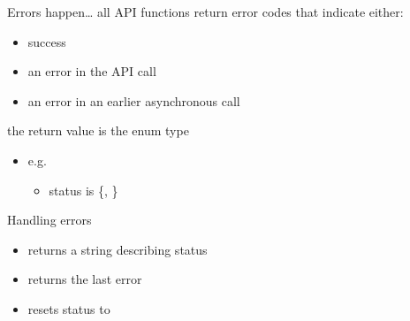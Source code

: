 \begin{frame}[fragile]{}

    \begin{info}{Errors happen\ldots}
        all API functions return error codes that indicate either:
        \begin{itemize}
            \item success
            \item an error in the API call
            \item an error in an earlier asynchronous call
        \end{itemize}
        the return value is the enum type 
        \begin{itemize}
            \item e.g. 
            \begin{itemize}
                \item status is \{, \}
            \end{itemize}
        \end{itemize}
    \end{info}

    \begin{info}{Handling errors}
        \centering {}
        \begin{itemize}
            \item returns a string describing status
        \end{itemize}
        \centering {}
        \begin{itemize}
            \item returns the last error
            \item resets status to 
        \end{itemize}
    \end{info}

\end{frame}

